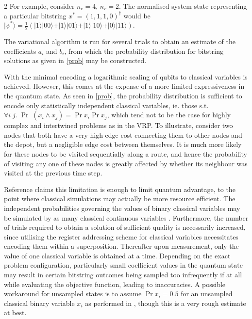 \documentclass [10pt]{article}
\newcommand {\qvec}[1] {\vert #1 \rangle}
\begin{document}
\begin {multicols}{2}
For example, consider $n_c = 4$, $n_r = 2$. The normalised system
state representing a particular bitstring $x^* = (1, 1, 1, 0)^\dag$
would be $\qvec{\psi^*} = \frac{1}{2}(\qvec{1}\qvec{00} + \qvec{1}\qvec{01}
+ \qvec{1}\qvec{10} + \qvec{0}\qvec{11})$.

The variational algorithm is run for several trials to obtain an estimate
of the coefficients $a_i$ and $b_i$, from which the probability distribution
for bitstring solutions as given in \eqref{prob} may be constructed.

With the minimal encoding a logarithmic scaling of qubits to classical
variables is achieved. However, this comes at the expense of a more limited
expressiveness in the quantum state. As seen in \eqref{prob}, the probability
distribution is sufficient to encode only statistically independent classical
variables, ie. those s.t.
$\forall i \; j. \; \Pr \; (x_i \land x_j) = \Pr x_i \Pr x_j$, which tend
not to be the case for highly complex and intertwined problems as in the VRP.
To illustrate, consider two nodes that both have a very high edge cost
connecting them to other nodes and the depot, but a negligible edge cost
between themselves. It is much more likely for these nodes to be visited
sequentially along a route, and hence the probability of visiting any one of
these nodes is greatly affected by whether its neighbour was visited at the
previous time step.

Reference \cite{effbinopt} claims this limitation is enough to limit quantum
advantage, to the point where classical simulations may actually be more
resource efficient. The independent probabilities governing the values of
binary classical variables may be simulated by as many classical continuous
variables \cite{contopt}.
Furthermore, the number of trials required to obtain a solution of
sufficient quality is necessarily increased, since utilising the register
addressing scheme for classical variables necessitates encoding them within a
superposition. Thereafter upon measurement, only the value of one classical
variable is obtained at a time. Depending on the exact problem
configuration, particularly small coefficient values in the quantum state
may result in certain bitstring outcomes being sampled too infrequently if at
all while evaluating the objective function, leading to inaccuracies. A
possible workaround for unsampled states is to assume $\Pr x_i = 0.5$ for an
unsampled classical binary variable $x_i$ as performed in \cite{effvrp},
though this is a very rough estimate at best.


\end{multicols}
\end{document}
